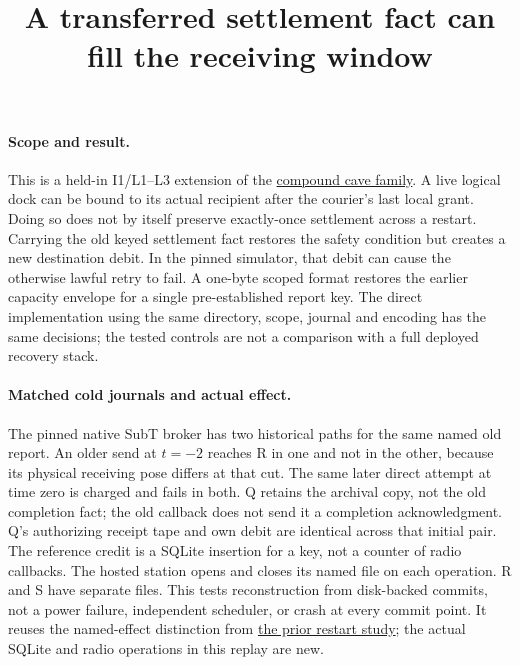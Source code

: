 \documentclass{article}
\title{A transferred settlement fact can fill the receiving window}
\author{}
\date{}
\begin{document}
\maketitle
\paragraph{Scope and result.}
This is a held-in I1/L1--L3 extension of the
\href{https://github.com/eternal-november/eos-research-programmes/pull/799}{compound cave family}.
A live logical dock can be bound to its actual recipient after the
courier's last local grant. Doing so does not by itself preserve
exactly-once settlement across a restart. Carrying the old keyed
settlement fact restores the safety condition but creates a new
destination debit. In the pinned simulator, that debit can cause
the otherwise lawful retry to fail. A one-byte scoped format
restores the earlier capacity envelope for a single pre-established
report key. The direct implementation using the same directory,
scope, journal and encoding has the same decisions; the tested
controls are not a comparison with a full deployed recovery stack.

\paragraph{Matched cold journals and actual effect.}
The pinned native SubT broker has two historical paths for the
same named old report. An older send at \(t=-2\) reaches R in
one and not in the other, because its physical receiving pose
differs at that cut. The same later direct attempt at time zero
is charged and fails in both. Q retains the archival copy, not the
old completion fact; the old callback does not send it a completion
acknowledgment. Q's authorizing receipt tape and own debit are
identical across that initial pair.
The reference credit is a SQLite insertion for a key,
not a counter of radio callbacks. The hosted station opens and
closes its named file on each operation. R and S have separate
files. This tests reconstruction from disk-backed commits, not a
power failure, independent scheduler, or crash at every commit point.
It reuses the named-effect distinction from
\href{https://github.com/eternal-november/eos-research-programmes/pull/640}{the prior restart study};
the actual SQLite and radio operations in this replay are new.
\end{document}
